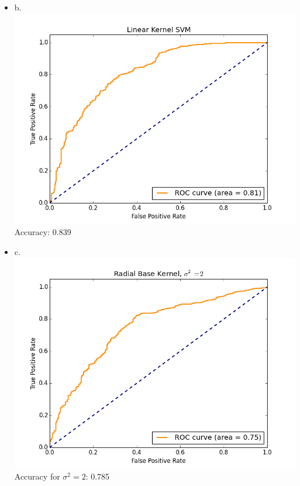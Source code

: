 \documentclass[11pt]{article}
\begin{document}
\begin{enumerate}
\begin{itemize}
\item b. \includegraphics[scale=.75]{linear.png}\\

Accuracy: 0.839

\item c.  \includegraphics[scale=.75]{radial2.png}\\

Accuracy for $\sigma^2=2$: 0.785



\end{itemize}
\end{enumerate}
\end{document}
